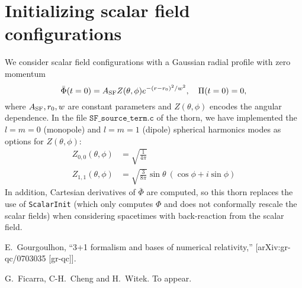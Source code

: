 \section{Initializing scalar field configurations}
We consider scalar field configurations with a Gaussian radial profile with zero momentum
\begin{equation}
    \bar{\Phi}(t=0) = A_{\rm SF} Z(\theta, \phi) e^{-(r-r_0)^2/w^2},
    \quad
    \Pi(t=0) = 0,
\end{equation}
where $A_{\rm SF}, r_0, w$ are constant parameters
and $Z(\theta, \phi)$ encodes the angular dependence.
In the file $\texttt{SF\_source\_term.c}$ of the thorn, we have implemented
the $l=m=0$ (monopole) and $l=m=1$ (dipole) spherical harmonics modes
as options for $Z(\theta, \phi)$:
\begin{align}
    Z_{0,0}(\theta, \phi)
    &= \sqrt{\frac{1}{4\pi}}
    \\
    Z_{1,1}(\theta, \phi)
    &= \sqrt{\frac{3}{8\pi}} \sin\theta\ (\cos\phi + i \sin\phi)
\end{align}
In addition, Cartesian derivatives of $\bar{\Phi}$ are computed,
so this thorn replaces the use of \texttt{ScalarInit}
(which only computes $\Phi$ and does not conformally rescale the scalar fields)
when considering spacetimes with back-reaction from the scalar field.

\begin{thebibliography}{9}

E.~Gourgoulhon,
``3+1 formalism and bases of numerical relativity,''
[arXiv:gr-qc/0703035 [gr-qc]].

  G.~Ficarra, C-H.~Cheng and H.~Witek. To appear.


\end{thebibliography}



